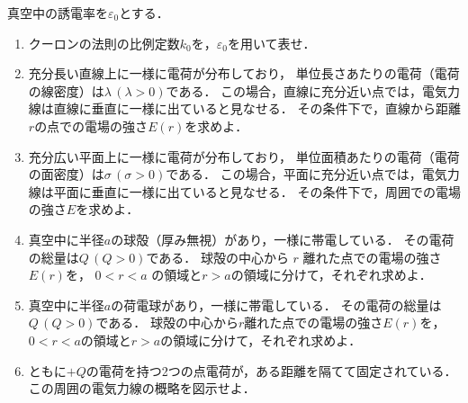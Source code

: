 \documentclass[../../../uem_phy_std_q.tex]{subfiles}
\begin{document}
真空中の誘電率を$\varepsilon_0$とする．

    \begin{enumerate}
        \item クーロンの法則の比例定数$k_0$を，$\varepsilon_0$を用いて表せ．
        \item 充分長い直線上に一様に電荷が分布しており，%
            単位長さあたりの電荷（電荷の線密度）は$\lambda \, (\lambda>0)$である．%
            この場合，直線に充分近い点では，電気力線は直線に垂直に一様に出ていると見なせる．%
            その条件下で，直線から距離$r$の点での電場の強さ$E(r)$を求めよ．
        \item 充分広い平面上に一様に電荷が分布しており，%
            単位面積あたりの電荷（電荷の面密度）は$\sigma \, (\sigma>0)$である．%
            この場合，平面に充分近い点では，電気力線は平面に垂直に一様に出ていると見なせる．%
            その条件下で，周囲での電場の強さ$E$を求めよ．
        \item 真空中に半径$a$の球殻（厚み無視）があり，一様に帯電している．%
            その電荷の総量は$Q \, (Q>0)$である．%
            球殻の中心から $r$ 離れた点での電場の強さ$E(r)$を，%
            $0<r<a$ の領域と$r>a$の領域に分けて，それぞれ求めよ．
        \item 真空中に半径$a$の荷電球があり，一様に帯電している．%
            その電荷の総量は$Q \, (Q>0)$である．%
            球殻の中心から$r$離れた点での電場の強さ$E(r)$を，%
            $0<r<a$の領域と$r>a$の領域に分けて，それぞれ求めよ．
        \item ともに$+Q$の電荷を持つ2つの点電荷が，ある距離を隔てて固定されている．%
            この周囲の電気力線の概略を図示せよ．
    \end{enumerate}
\end{document}
